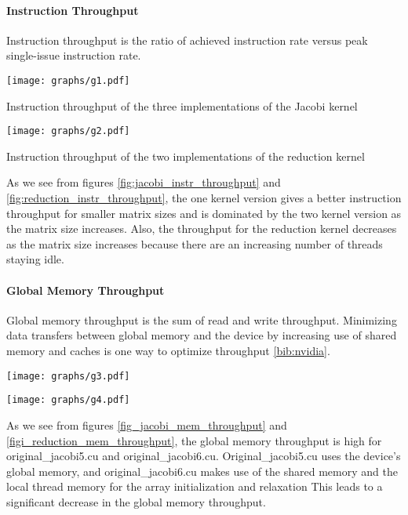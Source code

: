 \documentclass[10pt]{article}
\makeatletter
\newenvironment{figurehere}
{\def\@captype{figure}}
{}
\makeatother
\begin{document}
\begin{multicols}{2}
  \paragraph{Instruction Throughput}
  Instruction throughput is the ratio of achieved instruction rate versus peak single-issue instruction rate.

  \begin{figurehere}
    \centering
    \texttt{[image: graphs/g1.pdf]}
    \caption{Instruction throughput of the three implementations of the Jacobi kernel}
    \label{fig:jacobi_instr_throughput}
  \end{figurehere}

  \begin{figurehere}
    \centering
    \texttt{[image: graphs/g2.pdf]}
    \caption{Instruction throughput of the two implementations of the reduction kernel}
    \label{fig:reduction_instr_throughput}
  \end{figurehere}

  As we see from figures \ref{fig:jacobi_instr_throughput} and \ref{fig:reduction_instr_throughput}, the one kernel version gives a better instruction throughput for smaller matrix sizes and is dominated by the two kernel version as the matrix size increases.
  Also, the throughput for the reduction kernel decreases as the  matrix size increases because there are an increasing number of threads staying idle. 

  \paragraph{Global Memory Throughput}
  Global memory throughput is the sum of read and write throughput.
  Minimizing data transfers between global memory and the device by increasing use of shared memory and caches is one way to optimize throughput \ref{bib:nvidia}.

  \begin{figurehere}
    \centering
    \texttt{[image: graphs/g3.pdf]}
    \caption{}
    \label{fig:jacobi_mem_throughput}
  \end{figurehere}

  \begin{figurehere}
    \centering
    \texttt{[image: graphs/g4.pdf]}
    \caption{}
    \label{fig:reduction_mem_throughput}
  \end{figurehere}
  As we see from figures \ref{fig_jacobi_mem_throughput} and \ref{figi_reduction_mem_throughput}, the global memory throughput is high for original\_jacobi5.cu and original\_jacobi6.cu.
  Original\_jacobi5.cu uses the device's global memory, and original\_jacobi6.cu makes use of the shared memory and the local thread memory for the array initialization and relaxation 
  This leads to a significant decrease in the global memory throughput.


\end{multicols}
\end{document}
